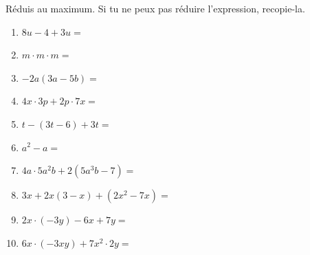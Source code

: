 %
%
    Réduis au maximum. Si tu ne peux pas réduire l'expression, recopie-la.
    \begin{enumerate}[itemsep=\fill]
        \item \(8u-4+3u=\)
        \item \(m\cdot m \cdot m =\)
        \item \(-2a(3a-5b)=\)
        \item \(4x\cdot 3p + 2p \cdot 7x=\)
        \item \(t-(3t-6) + 3t=\)
        \item \(a^2 - a=\)
        \item \(4a\cdot 5a^2b + 2(5a^3b -7)=\)
        \item \(3x + 2x(3-x) + (2x^2-7x)=\)
        \item \(2x \cdot (-3y) - 6x + 7y=\)
        \item \(6x \cdot (-3xy) + 7x^2 \cdot 2y=\)
    \end{enumerate}
    \vspace*{2cm}
